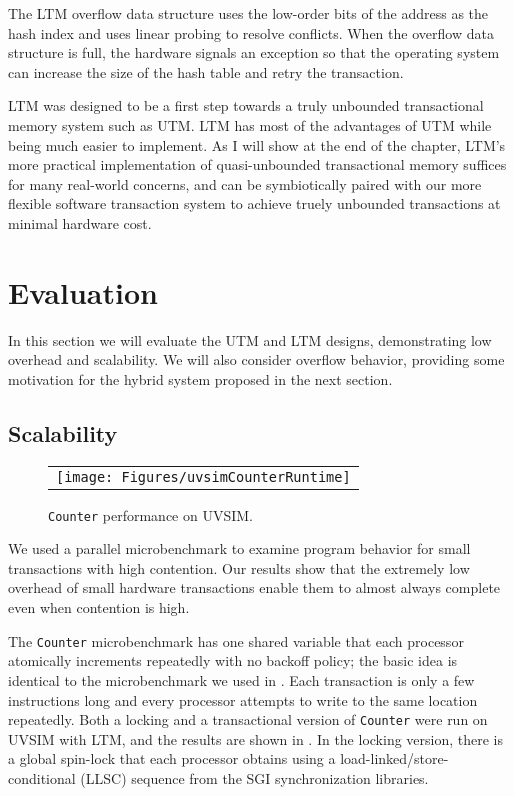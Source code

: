 The LTM overflow data structure uses the low-order bits of the address
as the hash index and uses linear probing to resolve conflicts.  When
the overflow data structure is full, the hardware signals an exception
so that the operating system can increase the size of the hash table
and retry the transaction.

LTM was designed to be a first step towards a truly unbounded
transactional memory system such as UTM.  LTM has most of the
advantages of UTM while being much easier to implement.  As I will
show at the end of the chapter, LTM's
more practical implementation of quasi-unbounded transactional memory
suffices for many real-world concerns, and can be symbiotically paired
with our more flexible software transaction system to achieve truely
unbounded transactions at minimal hardware cost.

\section{Evaluation}\label{sec:htm-benchmarks}
In this section we will evaluate the UTM and LTM designs,
demonstrating low overhead and scalability.  We will also
consider overflow behavior, providing some motivation for the hybrid
system proposed in the next section.

\subsection{Scalability}\label{sec:htm-counter}

\begin{figure}
\begin{center}
\begin{tabular}{c}
\texttt{[image: Figures/uvsimCounterRuntime]}
\end{tabular}
\end{center}
\caption{\texttt{Counter} performance on UVSIM.}
\label{fig:microbenchperf}
\end{figure}

We used a parallel microbenchmark to examine
program behavior for small transactions with high contention. Our
results show that the extremely low overhead of small hardware transactions
enable them to almost always complete even when contention is high.

The \texttt{Counter} microbenchmark has one shared variable that each
processor atomically increments repeatedly with no backoff
policy; the basic idea is identical to the microbenchmark we used in
.
Each transaction is only a few instructions long and every
processor attempts to write to the same location repeatedly.  Both a
locking and a transactional version of \texttt{Counter} were run on
UVSIM with LTM, and the results are shown in
. In the locking version, there is a global
spin-lock that each processor obtains using a
load-linked/store-conditional (LLSC) sequence from the SGI
synchronization libraries.

